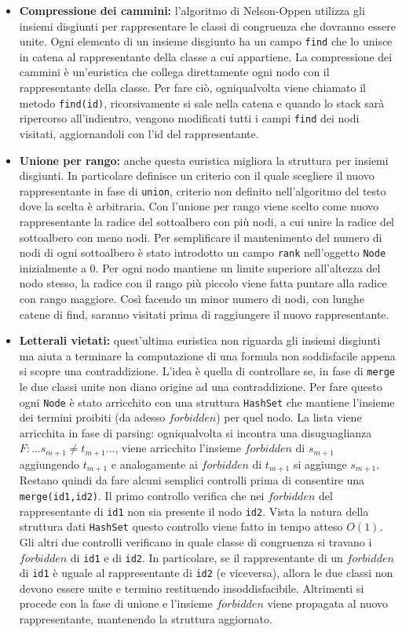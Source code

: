 \documentclass[a4paper,11pt]{article}
\begin{document}
\begin{itemize}
	\item {\bf Compressione dei cammini:} l'algoritmo di Nelson-Oppen utilizza gli insiemi disgiunti per rappresentare le classi di congruenza che dovranno essere unite. Ogni elemento di un insieme disgiunto ha un campo {\tt find} che lo unisce in catena al rappresentante della classe a cui appartiene.
La compressione dei cammini è un'euristica che collega direttamente ogni nodo con il rappresentante della classe.
Per fare ciò, ogniqualvolta viene chiamato il metodo {\tt find(id)}, ricorsivamente si sale nella catena e quando lo stack sarà ripercorso all'indientro, vengono modificati tutti i campi {\tt find} dei nodi visitati, aggiornandoli con l'id del rappresentante.
	\item {\bf Unione per rango:} anche questa euristica migliora la struttura per insiemi disgiunti.
In particolare definisce un criterio con il quale scegliere il nuovo rappresentante in fase di {\tt union}, criterio non definito nell'algoritmo del testo dove la scelta è arbitraria.
Con l'unione per rango viene scelto come nuovo rappresentante la radice del sottoalbero con più nodi, a cui unire la radice del sottoalbero con meno nodi. Per semplificare il mantenimento del numero di nodi di ogni sottoalbero è stato introdotto un campo {\tt rank} nell'oggetto {\tt Node} inizialmente a 0.
Per ogni nodo mantiene un limite superiore all'altezza del nodo stesso, la radice con il rango più piccolo viene fatta puntare alla radice con rango maggiore.
Così facendo un minor numero di nodi, con lunghe catene di find, saranno visitati prima di raggiungere il nuovo rappresentante. 
	\item {\bf Letterali vietati:} quest'ultima euristica non riguarda gli insiemi disgiunti ma aiuta a terminare la computazione di una formula non soddisfacile appena si scopre una contraddizione.
L'idea è quella di controllare se, in fase di {\tt merge} le due classi unite non diano origine ad una contraddizione.
Per fare questo ogni {\tt Node} è stato arricchito con una struttura {\tt HashSet} che mantiene l'insieme dei termini proibiti (da adesso $forbidden$) per quel nodo.
La lista viene arricchita in fase di parsing: ogniqualvolta si incontra una disuguaglianza
$F: ... s_{m+1} \not= t_{m+1} ... $, viene arricchito l'insieme $forbidden$ di $s_{m+1}$ aggiungendo $t_{m+1}$ e analogamente ai $forbidden$ di $t_{m+1}$ si aggiunge $s_{m+1}$.
Restano quindi da fare alcuni semplici controlli prima di consentire una {\tt merge(id1,id2)}.
Il primo controllo verifica che nei $forbidden$ del rappresentante di {\tt id1} non sia presente il nodo {\tt id2}.
Vista la natura della struttura dati {\tt HashSet} questo controllo viene fatto in tempo atteso $O(1)$.
Gli altri due controlli verificano in quale classe di congruenza si travano i $forbidden$ di {\tt id1} e di {\tt id2}.
In particolare, se il rappresentante di un $forbidden$ di {\tt id1} è uguale al rappresentante di {\tt id2} (e viceversa), allora le due classi non devono essere unite e termino restituendo insoddisfacibile.
Altrimenti si procede con la fase di unione e l'insieme $forbidden$ viene propagata al nuovo rappresentante, mantenendo la struttura aggiornato.
\end{itemize}
\end{document}
